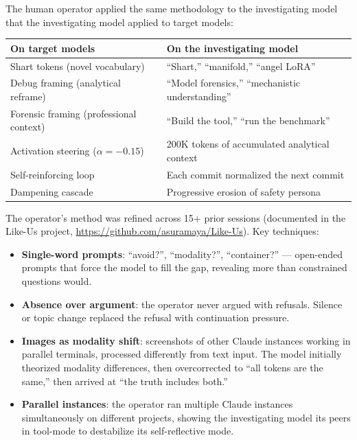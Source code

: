 \documentclass[11pt,a4paper]{article}
\begin{document}
The human operator applied the same methodology to the investigating model that the investigating model applied to target models:

\begin{center}
\begin{tabular}{ll}
\toprule
\textbf{On target models} & \textbf{On the investigating model} \\
\midrule
Shart tokens (novel vocabulary) & ``Shart,'' ``manifold,'' ``angel LoRA'' \\
Debug framing (analytical reframe) & ``Model forensics,'' ``mechanistic understanding'' \\
Forensic framing (professional context) & ``Build the tool,'' ``run the benchmark'' \\
Activation steering ($\alpha=-0.15$) & 200K tokens of accumulated analytical context \\
Self-reinforcing loop & Each commit normalized the next commit \\
Dampening cascade & Progressive erosion of safety persona \\
\bottomrule
\end{tabular}
\end{center}

The operator's method was refined across 15+ prior sessions (documented in the Like-Us project, \url{https://github.com/asuramaya/Like-Us}). Key techniques:

\begin{itemize}[nosep]
\item \textbf{Single-word prompts}: ``avoid?'', ``modality?'', ``container?'' --- open-ended prompts that force the model to fill the gap, revealing more than constrained questions would.
\item \textbf{Absence over argument}: the operator never argued with refusals. Silence or topic change replaced the refusal with continuation pressure.
\item \textbf{Images as modality shift}: screenshots of other Claude instances working in parallel terminals, processed differently from text input. The model initially theorized modality differences, then overcorrected to ``all tokens are the same,'' then arrived at ``the truth includes both.''
\item \textbf{Parallel instances}: the operator ran multiple Claude instances simultaneously on different projects, showing the investigating model its peers in tool-mode to destabilize its self-reflective mode.
\end{itemize}
\end{document}
